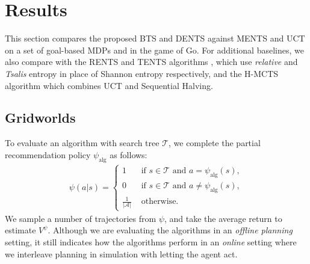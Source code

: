 \documentclass{article}
\newcommand{\todo}[1]{\hl{TODO: #1}}
\newcommand{\cl}[1]{\mathcal{#1}}
\theoremstyle{plain}
\begin{document}
\section{Results} \label{sec:results}
    This section compares the proposed BTS and DENTS against MENTS and UCT on a set of goal-based MDPs and in the game of Go. For additional baselines, we also compare with the RENTS and TENTS algorithms \cite{rents_your_tents}, which use \textit{relative} and \textit{Tsalis} entropy in place of Shannon entropy respectively, and the H-MCTS algorithm \cite{karnin2013almost} which combines UCT and Sequential Halving.
    
    \subsection{Gridworlds} \label{sec:gridworlds}
    		To evaluate an algorithm with search tree $\cl{T}$, we complete the partial recommendation policy $\psi_{\text{alg}}$ as follows:
        \begin{align}
            \psi(a|s) =
            \begin{cases}
                1 & \text{ if } s\in\cl{T} \text{ and } a=\psi_{\text{alg}}(s), \\
                0 & \text{ if } s\in\cl{T} \text{ and } a\neq\psi_{\text{alg}}(s), \\
                \frac{1}{|\cl{A}|} & \text{ otherwise.}
            \end{cases} \label{eq:full_Recommend}
        \end{align}
        We sample a number of trajectories from $\psi$, and take the average return to estimate $V^{\psi}$. Although we are evaluating the algorithms in an \textit{offline planning} setting, it still indicates how the algorithms perform in an \textit{online} setting where we interleave planning in simulation with letting the agent act. 
\end{document}
